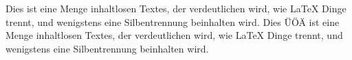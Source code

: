 \documentclass{article}
\begin{document}
Dies ist eine Menge inhaltlosen Textes, der verdeutlichen wird, wie
LaTeX Dinge trennt, und wenigstens eine Silbentrennung beinhalten wird.
Dies ÜÖÄ ist eine Menge inhaltlosen Textes, der verdeutlichen wird, wie
LaTeX Dinge trennt, und wenigstens eine Silbentrennung beinhalten wird.
\end{document}
